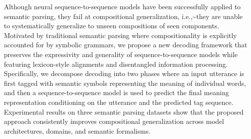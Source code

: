 Although neural sequence-to-sequence models have been successfully applied to semantic parsing, they fail at compositional generalization, i.e.,{\textasciitilde}they are unable to systematically generalize to unseen compositions of seen components. Motivated by traditional semantic parsing where compositionality is explicitly accounted for by symbolic grammars, we propose a new decoding framework that preserves the expressivity and generality of sequence-to-sequence models while featuring lexicon-style alignments and disentangled information processing. Specifically, we decompose decoding into two phases where an input utterance is first tagged with semantic symbols representing the meaning of individual words, and then a sequence-to-sequence model is used to predict the final meaning representation conditioning on the utterance and the predicted tag sequence. Experimental results on three semantic parsing datasets show that the proposed approach consistently improves compositional generalization across model architectures, domains, and semantic formalisms.
